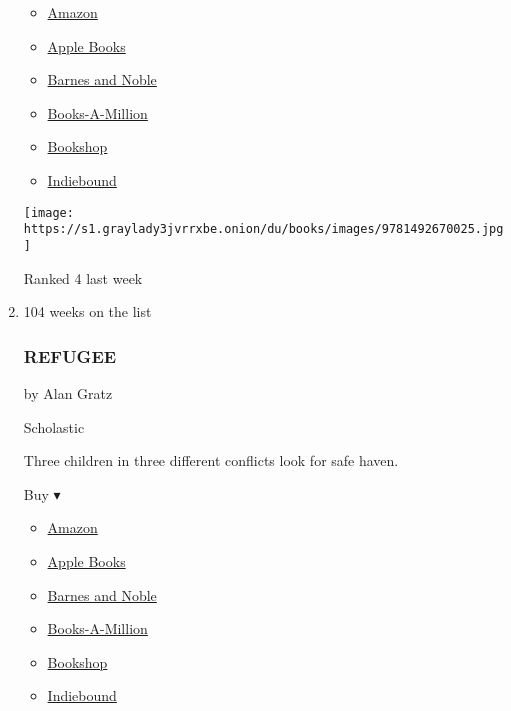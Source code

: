 \begin{enumerate}
  \begin{itemize}
  \tightlist
  \item
    \href{https://www.amazon.com/Complete-Cookbook-Young-Chefs/dp/1492670022?tag=NYTBS-20}{Amazon}
  \item
    \href{https://du-gae-books-dot-nyt-du-prd.appspot.com/buy?title=THE+COMPLETE+COOKBOOK+FOR+YOUNG+CHEFS\&author=America\%27s+Test+Kitchen+Kids}{Apple
    Books}
  \item
    \href{https://www.anrdoezrs.net/click-7990613-11819508?url=https\%3A\%2F\%2Fwww.barnesandnoble.com\%2Fw\%2F\%3Fean\%3D9781492670025}{Barnes
    and Noble}
  \item
    \href{https://www.anrdoezrs.net/click-7990613-35140?url=https\%3A\%2F\%2Fwww.booksamillion.com\%2Fp\%2FTHE\%2BCOMPLETE\%2BCOOKBOOK\%2BFOR\%2BYOUNG\%2BCHEFS\%2FAmerica\%2527s\%2BTest\%2BKitchen\%2BKids\%2F9781492670025}{Books-A-Million}
  \item
    \href{https://bookshop.org/a/3546/9781492670025}{Bookshop}
  \item
    \href{https://www.indiebound.org/book/9781492670025?aff=NYT}{Indiebound}
  \end{itemize}

  \texttt{[image: https://s1.graylady3jvrrxbe.onion/du/books/images/9781492670025.jpg]}

  Ranked 4 last week
\item
  104 weeks on the list

  \hypertarget{refugee}{%
  \subsubsection{REFUGEE}\label{refugee}}

  by Alan Gratz

  Scholastic

  Three children in three different conflicts look for safe haven.

  Buy ▾

  \begin{itemize}
  \tightlist
  \item
    \href{https://www.amazon.com/Refugee-Alan-Gratz/dp/0545880831?tag=NYTBS-20}{Amazon}
  \item
    \href{https://du-gae-books-dot-nyt-du-prd.appspot.com/buy?title=REFUGEE\&author=Alan+Gratz}{Apple
    Books}
  \item
    \href{https://www.anrdoezrs.net/click-7990613-11819508?url=https\%3A\%2F\%2Fwww.barnesandnoble.com\%2Fw\%2F\%3Fean\%3D9780545880831}{Barnes
    and Noble}
  \item
    \href{https://www.anrdoezrs.net/click-7990613-35140?url=https\%3A\%2F\%2Fwww.booksamillion.com\%2Fp\%2FREFUGEE\%2FAlan\%2BGratz\%2F9780545880831}{Books-A-Million}
  \item
    \href{https://bookshop.org/a/3546/9780545880831}{Bookshop}
  \item
    \href{https://www.indiebound.org/book/9780545880831?aff=NYT}{Indiebound}
  \end{itemize}


\end{enumerate}
